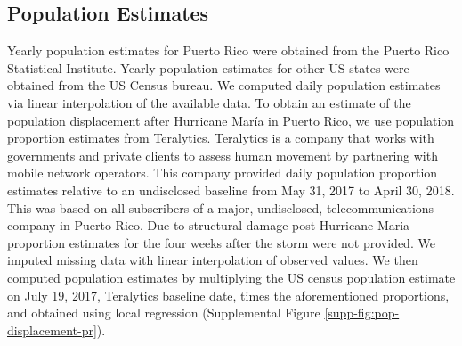 \documentclass[11pt]{article}
\begin{document}
\subsection{Population Estimates}
\label{subsec:population}
Yearly population estimates for Puerto Rico were obtained from the Puerto Rico Statistical Institute. Yearly population estimates for other US states were obtained from the US Census bureau. We computed daily population estimates via linear interpolation of the available data. To obtain an estimate of the population displacement after Hurricane Mar\'ia in Puerto Rico, we use population proportion estimates from Teralytics. Teralytics is a company that works with governments and private clients to assess human movement by partnering with mobile network operators. This company provided daily population proportion estimates relative to an undisclosed baseline from May 31, 2017 to April 30, 2018. This was based on all subscribers of a major, undisclosed, telecommunications company in Puerto Rico. Due to structural damage post Hurricane Maria proportion estimates for the four weeks after the storm were not provided. We imputed missing data with linear interpolation of observed values. We then computed population estimates by multiplying the US census population estimate on July 19, 2017, Teralytics baseline date, times the aforementioned proportions, and obtained using local regression (Supplemental Figure \ref{supp-fig:pop-displacement-pr}).
\end{document}
